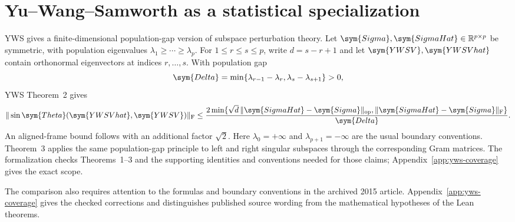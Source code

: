 \section{Yu--Wang--Samworth as a statistical specialization}
\label{sec:yws}

YWS \citep{yu2015davis} gives a finite-dimensional population-gap version of
subspace perturbation theory.  Let
$\sym{Sigma},\sym{SigmaHat}\in\mathbb{R}^{p\times p}$ be symmetric, with population
eigenvalues $\lambda_1\ge\cdots\ge\lambda_p$.  For
$1\le r\le s\le p$, write $d=s-r+1$ and let $\sym{YWSV},\sym{YWSVhat}$ contain orthonormal
eigenvectors at indices $r,\ldots,s$.  With population gap
\[
  \sym{Delta}=
  \min\{\lambda_{r-1}-\lambda_r,\lambda_s-\lambda_{s+1}\}>0,
\]
YWS Theorem~2 gives
\begin{equation}
  \|\sin\sym{Theta}(\sym{YWSVhat},\sym{YWSV})\|_{\mathrm F}
  \le
  \frac{2\min\{\sqrt d\,\|\sym{SigmaHat}-\sym{Sigma}\|_{\mathrm{op}},
                    \|\sym{SigmaHat}-\sym{Sigma}\|_{\mathrm F}\}}
       {\sym{Delta}}.
  \label{eq:yws-sintheta}
\end{equation}
An aligned-frame bound follows with an additional factor $\sqrt2$.
Here $\lambda_0=+\infty$ and $\lambda_{p+1}=-\infty$ are the usual
boundary conventions. Theorem~3 applies the same population-gap principle to left and right singular
subspaces through the corresponding Gram matrices.  The formalization checks
Theorems~1--3 and the supporting identities and conventions needed for those
claims; Appendix~\ref{app:yws-coverage} gives the exact scope.

The comparison also requires attention to the formulas and boundary
conventions in the archived 2015 article. Appendix~\ref{app:yws-coverage}
gives the checked corrections and distinguishes published source wording
from the mathematical hypotheses of the Lean theorems.
